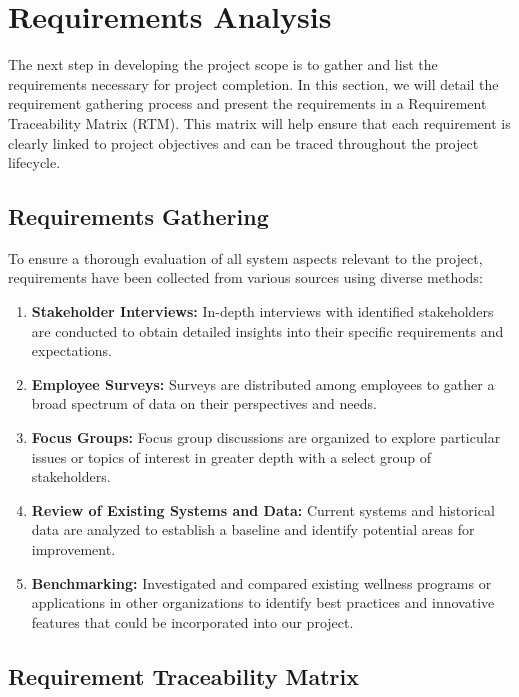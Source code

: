 \section{Requirements Analysis}

The next step in developing the project scope is to gather and list the requirements necessary for project completion. In this section, we will detail the requirement gathering process and present the requirements in a Requirement Traceability Matrix (RTM). This matrix will help ensure that each requirement is clearly linked to project objectives and can be traced throughout the project lifecycle.


\subsection{Requirements Gathering}

To ensure a thorough evaluation of all system aspects relevant to the project, requirements have been collected from various sources using diverse methods:

\begin{enumerate}
    \item \textbf{Stakeholder Interviews:} In-depth interviews with identified stakeholders are conducted to obtain detailed insights into their specific requirements and expectations.
    \item \textbf{Employee Surveys:} Surveys are distributed among employees to gather a broad spectrum of data on their perspectives and needs.
    \item \textbf{Focus Groups:} Focus group discussions are organized to explore particular issues or topics of interest in greater depth with a select group of stakeholders.
    \item \textbf{Review of Existing Systems and Data:} Current systems and historical data are analyzed to establish a baseline and identify potential areas for improvement.
    \item \textbf{Benchmarking:} Investigated and compared existing wellness programs or applications in other organizations to identify best practices and innovative features that could be incorporated into our project.

\end{enumerate}

\subsection{Requirement Traceability Matrix}

